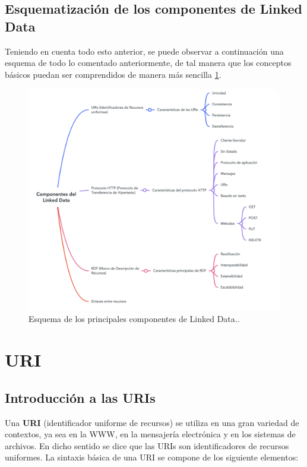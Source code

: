 \documentclass[11pt]{report}
\begin{document}
\section{Esquematización de los componentes de Linked Data}

Teniendo en cuenta todo esto anterior, se puede observar a continuación una esquema de todo lo comentado anteriormente, de tal manera que los conceptos básicos puedan ser comprendidos de manera más sencilla \ref{fig:Componentes-Linked-Data}.

\begin{figure}[H]
	\centering
	\includegraphics[scale=0.8]{../img/Componentes-Linked-Data.png}
	\caption{Esquema de los principales componentes de Linked Data..}
	\label{fig:Componentes-Linked-Data}
\end{figure}

\chapter{URI}

\section{Introducción a las URIs}

Una \textbf{URI} (identificador uniforme de recursos) se utiliza en una gran variedad de contextos, ya sea en la WWW, en la mensajería electrónica y en los sistemas de archivos. En dicho sentido se dice que las URIs son identificadores de recursos uniformes. La sintaxis básica de una URI se compone de los siguiente elementos:
\end{document}
